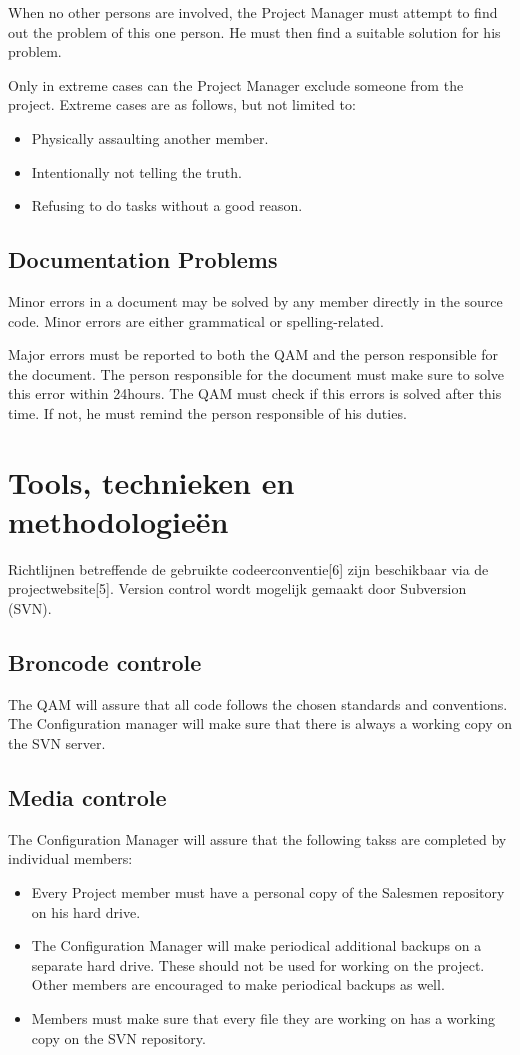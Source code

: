 \documentclass[salesmen, twoside]{softproj}
\begin{document}
\begin{projdoc}
When no other persons are involved, the Project Manager must attempt to find out the problem of this one person. He must then find a suitable solution for his problem.

Only in extreme cases can the Project Manager exclude someone from the project. Extreme cases are as follows, but not limited to:
\begin{itemize}
\item
Physically assaulting another member.
\item
Intentionally not telling the truth.
\item
Refusing to do tasks without a good reason.
\end{itemize}

\section{Documentation Problems}
Minor errors in a document may be solved by any member directly in the source code. Minor errors are either grammatical or spelling-related.

Major errors must be reported to both the QAM and the person responsible for the document. The person responsible for the document must make sure to solve this error within 24hours. The QAM must check if this errors is solved after this time. If not, he must remind the person responsible of his duties.

\chapter{Tools, technieken en methodologie\"en}
Richtlijnen betreffende de gebruikte codeerconventie[6] zijn beschikbaar via de projectwebsite[5].  Version control wordt mogelijk gemaakt door Subversion (SVN).

\section{Broncode controle}
The QAM will assure that all code follows the chosen standards and conventions. The Configuration manager will make sure that there is always a working copy on the SVN server.

\section{Media controle}
The Configuration Manager will assure that the following takss are completed by individual members:
\begin{itemize}
\item
Every Project member must have a personal copy of the Salesmen repository on his hard drive.
\item
The Configuration Manager will make periodical additional backups on a separate hard drive. These should not be used for working on the project. Other members are encouraged to make periodical backups as well.
\item
Members must make sure that every file they are working on has a working copy on the SVN repository.
\end{itemize}


\end{projdoc}
\end{document}
